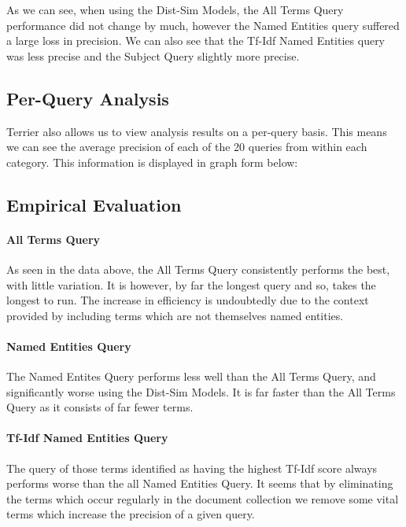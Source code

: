 \documentclass{l4proj}
\begin{document}
As we can see, when using the Dist-Sim Models, the All Terms Query performance did not change by much, however the Named Entities query suffered a large loss in precision. We can also see that the Tf-Idf Named Entities query was less precise and the Subject Query slightly more precise.

\subsection{Per-Query Analysis}
Terrier also allows us to view analysis results on a per-query basis. This means we can see the average precision of each of the 20 queries from within each category.
This information is displayed in graph form below:

\subsection{Empirical Evaluation}
\paragraph{All Terms Query}
As seen in the data above, the All Terms Query consistently performs the best, with little variation. It is however, by far the longest query and so, takes the longest to run. The increase in efficiency is undoubtedly due to the context provided by including terms which are not themselves named entities. 
\paragraph{Named Entities Query}
The Named Entites Query performs less well than the All Terms Query, and significantly worse using the Dist-Sim Models. It is far faster than the All Terms Query as it consists of far fewer terms.
\paragraph{Tf-Idf Named Entities Query}
The query of those terms identified as having the highest Tf-Idf score always performs worse than the all Named Entities Query. It seems that by eliminating the terms which occur regularly in the document collection we remove some vital terms which increase the precision of a given query.
\end{document}

